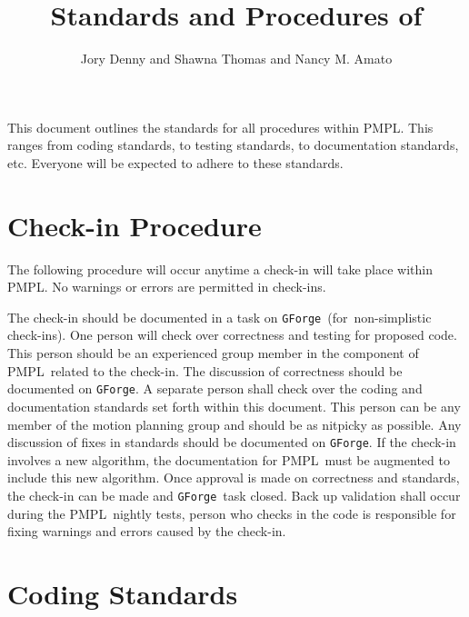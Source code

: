 \documentclass[12pt]{article}
\title{\Large \bf Standards and Procedures of \pmpl}
\author{Jory Denny and Shawna Thomas and Nancy M. Amato}
\newcommand{\pmpl}{PMPL}
\newcommand{\gforge}{\texttt{GForge}}
\begin{document}
\lstset{style=C++}

\maketitle
\thispagestyle{empty}
\pagestyle{empty}

This document outlines the standards for all procedures within \pmpl. This
ranges from coding standards, to testing standards, to documentation standards,
etc. Everyone will be expected to adhere to these standards.

\clearpage
\pagestyle{plain}


\section{Check-in Procedure}
The following procedure will occur anytime a check-in will take place within
\pmpl. No warnings or errors are permitted in check-ins.
\begin{algorithmic}[1]
\STATE The check-in should be documented in a task on \gforge\ (for\
non-simplistic check-ins).
\STATE One person will check over correctness and testing for proposed code.
This person should be an experienced group member in the component of \pmpl\
related to the check-in. The discussion of correctness should be documented on
\gforge.
\STATE A separate person shall check over the coding and documentation standards
set forth within this document. This person can be any member of the motion
planning group and should be as nitpicky as possible. Any discussion of fixes in
standards should be documented on \gforge.
\STATE If the check-in involves a new algorithm, the documentation for \pmpl\
must be augmented to include this new algorithm.
\STATE Once approval is made on correctness and standards, the check-in can be
made and \gforge\ task closed.
\STATE Back up validation shall occur during the \pmpl\ nightly tests, person
who checks in the code is responsible for fixing warnings and errors caused by
the check-in.
\end{algorithmic}


\section{Coding Standards}
\end{document}
